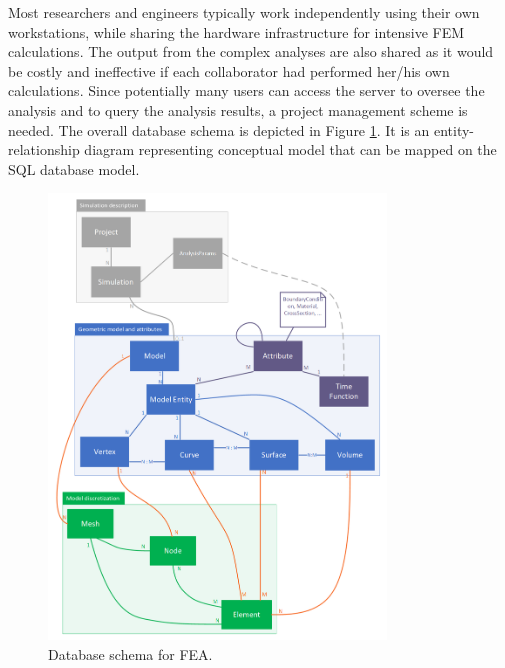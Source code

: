 
Most researchers and engineers typically work independently using their own workstations, while sharing the hardware infrastructure for intensive FEM calculations. The output from the complex analyses are also shared as it would be costly and ineffective if each collaborator had performed her/his own calculations. Since potentially many users can access the server to oversee the analysis and to query the analysis results, a project management scheme is needed. The overall database schema is depicted in Figure \ref{fig:FEA-db-schema}. It is an entity-relationship diagram representing conceptual model that can be mapped on the SQL database model.

\begin{figure}[H]
    \centering
    \includegraphics[width=0.8\textwidth]{figures/FEA-database-schema}
    \decoRule
    \caption{Database schema for FEA.}
    \label{fig:FEA-db-schema}
\end{figure}

